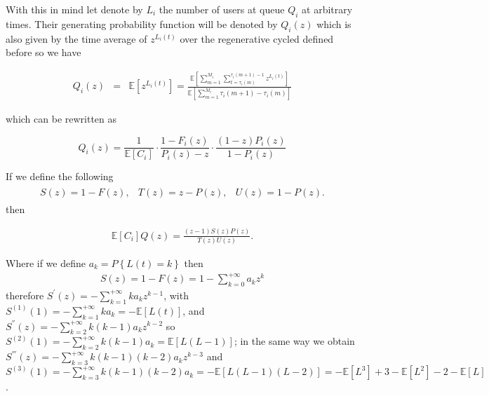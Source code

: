 \documentclass{article}
\newcommand{\esp}{\mathbb{E}}
\begin{document}
With this in mind let denote by $L_{i}$ the number of users at queue $Q_{i}$ at arbitrary times. Their generating probability function  will be denoted by $Q_{i}\left(z\right)$ which is also given by the time average of $z^{L_{i}\left(t\right)}$ over the regenerative cycled defined before so we have

\begin{eqnarray*}
Q_{i}\left(z\right)&=&\esp\left[z^{L_{i}\left(t\right)}\right]=\frac{\esp\left[\sum_{m=1}^{M_{i}}\sum_{t=\tau_{i}\left(m\right)}^{\tau_{i}\left(m+1\right)-1}z^{L_{i}\left(t\right)}\right]}{\esp\left[\sum_{m=1}^{M_{i}}\tau_{i}\left(m+1\right)-\tau_{i}\left(m\right)\right]}
\end{eqnarray*}

which can be rewritten as

\begin{equation}\label{Eq.Long.Caulquier.Tiempo}
Q_{i}\left(z\right)=\frac{1}{\esp\left[C_{i}\right]}\cdot\frac{1-F_{i}\left(z\right)}{P_{i}\left(z\right)-z}\cdot\frac{\left(1-z\right)P_{i}\left(z\right)}{1-P_{i}\left(z\right)}
\end{equation}

If we define the following
\begin{eqnarray}
\begin{array}{ccc}
S\left(z\right)=1-F\left(z\right),&
T\left(z\right)=z-P\left(z\right),&
U\left(z\right)=1-P\left(z\right).
\end{array}
\end{eqnarray}
then 

\begin{eqnarray}
\esp\left[C_{i}\right]Q\left(z\right)=\frac{\left(z-1\right)S\left(z\right)P\left(z\right)}{T\left(z\right)U\left(z\right)}.
\end{eqnarray}

Where if we define $a_{k}=P\left\{L\left(t\right)=k\right\}$ then 
\begin{eqnarray*}
S\left(z\right)=1-F\left(z\right)=1-\sum_{k=0}^{+\infty}a_{k}z^{k}
\end{eqnarray*}
therefore $S^{'}\left(z\right)=-\sum_{k=1}^{+\infty}ka_{k}z^{k-1}$, with $S^{(1)}\left(1\right)=-\sum_{k=1}^{+\infty}ka_{k}=-\esp\left[L\left(t\right)\right]$,
and $S^{''}\left(z\right)=-\sum_{k=2}^{+\infty}k(k-1)a_{k}z^{k-2}$ so  $S^{(2)}\left(1\right)=-\sum_{k=2}^{+\infty}k(k-1)a_{k}=\esp\left[L\left(L-1\right)\right]$;
in the same way we obtain $S^{'''}\left(z\right)=-\sum_{k=3}^{+\infty}k(k-1)(k-2)a_{k}z^{k-3}$ and $S^{(3)}\left(1\right)=-\sum_{k=3}^{+\infty}k(k-1)(k-2)a_{k}=-\esp\left[L\left(L-1\right)\left(L-2\right)\right]
=-\esp\left[L^{3}\right]+3-\esp\left[L^{2}\right]-2-\esp\left[L\right]$. 
\end{document}

